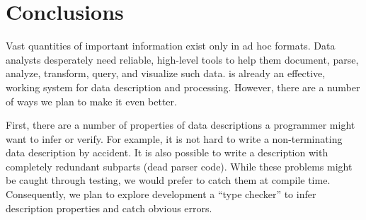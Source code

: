 \section{Conclusions}
\label{sec:future}
Vast quantities of important information exist only in ad hoc formats.  
Data analysts desperately need reliable, high-level tools to 
help them document, parse, analyze, transform, query, and visualize such data.  
\padsml{} is already an effective, working system for data description
and processing.  However, there are a number of ways we plan to make it 
even better.

First, there are a number of properties of data descriptions
a programmer might want to infer or verify.  For example, it is not hard to
write a non-terminating data description by accident.  It
is also possible to write a description with completely redundant
subparts (dead parser code).  While these problems might be caught 
through testing,
we would prefer to catch them at compile time.  
Consequently,
we plan to explore development a \padsml{} ``type checker'' 
to infer description properties and catch obvious errors.

